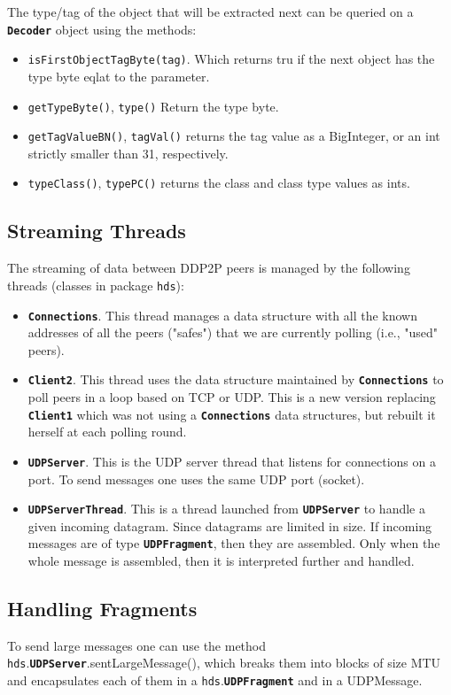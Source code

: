 \documentclass{book}
\newcommand{\pkg}[1]{{\tt #1}}
\newcommand{\cls}[1]{{\tt\bf #1}}
\newcommand{\mth}[1]{{\tt #1}}
\begin{document}
The type/tag of the object that will be extracted next can be queried on a \cls{Decoder} object using the methods:
\begin{itemize}
\item
\mth{isFirstObjectTagByte(tag)}.
Which returns tru if the next object has the type byte eqlat to the parameter.
\item
\mth{getTypeByte()}, \mth{type()}
Return the type byte.
\item
\mth{getTagValueBN()}, \mth{tagVal()}
returns the tag value as a BigInteger, or an int strictly smaller than 31, respectively.
\item
\mth{typeClass()}, \mth{typePC()}
returns the class and class type values as ints.
\end{itemize}

\subsection{Streaming Threads}
The streaming of data between DDP2P peers is managed by the following threads (classes in package \pkg{hds}):
\begin{itemize}
\item
\cls{Connections}. This thread manages a data structure with all the known addresses of all the peers ("safes") that we are currently polling (i.e., "used" peers).
\item
\cls{Client2}. This thread uses the data structure maintained by \cls{Connections} to poll peers in a loop based on TCP or UDP. This is a new
version replacing \cls{Client1} which was not using a \cls{Connections} data structures, but rebuilt it herself at each polling round.
\item
\cls{UDPServer}. This is the UDP server thread that listens for connections on a port. To send messages one uses the same 
UDP port (socket). 

\item
\cls{UDPServerThread}. This is a thread launched from \cls{UDPServer} to handle a given incoming datagram. Since
datagrams are limited in size. If incoming messages are of type \cls{UDPFragment}, then they are assembled. Only when
the whole message is assembled, then it is interpreted further and handled.
\end{itemize}

\subsection{Handling Fragments}
To send large messages one can use the method \pkg{hds}.\cls{UDPServer}.sentLargeMessage(),
which breaks them into blocks of size MTU and encapsulates each of them in a \pkg{hds}.\cls{UDPFragment} and in a UDPMessage.
\end{document}

